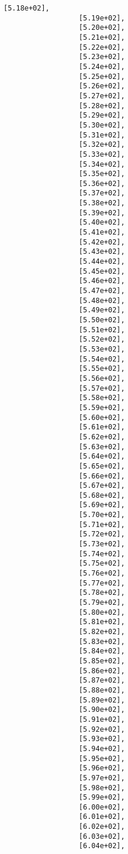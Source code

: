 \documentclass[11pt]{article}
\begin{document}
\begin{Verbatim}[commandchars=\\\{\}]
                  [5.18e+02],
                  [5.19e+02],
                  [5.20e+02],
                  [5.21e+02],
                  [5.22e+02],
                  [5.23e+02],
                  [5.24e+02],
                  [5.25e+02],
                  [5.26e+02],
                  [5.27e+02],
                  [5.28e+02],
                  [5.29e+02],
                  [5.30e+02],
                  [5.31e+02],
                  [5.32e+02],
                  [5.33e+02],
                  [5.34e+02],
                  [5.35e+02],
                  [5.36e+02],
                  [5.37e+02],
                  [5.38e+02],
                  [5.39e+02],
                  [5.40e+02],
                  [5.41e+02],
                  [5.42e+02],
                  [5.43e+02],
                  [5.44e+02],
                  [5.45e+02],
                  [5.46e+02],
                  [5.47e+02],
                  [5.48e+02],
                  [5.49e+02],
                  [5.50e+02],
                  [5.51e+02],
                  [5.52e+02],
                  [5.53e+02],
                  [5.54e+02],
                  [5.55e+02],
                  [5.56e+02],
                  [5.57e+02],
                  [5.58e+02],
                  [5.59e+02],
                  [5.60e+02],
                  [5.61e+02],
                  [5.62e+02],
                  [5.63e+02],
                  [5.64e+02],
                  [5.65e+02],
                  [5.66e+02],
                  [5.67e+02],
                  [5.68e+02],
                  [5.69e+02],
                  [5.70e+02],
                  [5.71e+02],
                  [5.72e+02],
                  [5.73e+02],
                  [5.74e+02],
                  [5.75e+02],
                  [5.76e+02],
                  [5.77e+02],
                  [5.78e+02],
                  [5.79e+02],
                  [5.80e+02],
                  [5.81e+02],
                  [5.82e+02],
                  [5.83e+02],
                  [5.84e+02],
                  [5.85e+02],
                  [5.86e+02],
                  [5.87e+02],
                  [5.88e+02],
                  [5.89e+02],
                  [5.90e+02],
                  [5.91e+02],
                  [5.92e+02],
                  [5.93e+02],
                  [5.94e+02],
                  [5.95e+02],
                  [5.96e+02],
                  [5.97e+02],
                  [5.98e+02],
                  [5.99e+02],
                  [6.00e+02],
                  [6.01e+02],
                  [6.02e+02],
                  [6.03e+02],
                  [6.04e+02],

\end{Verbatim}
\end{document}
